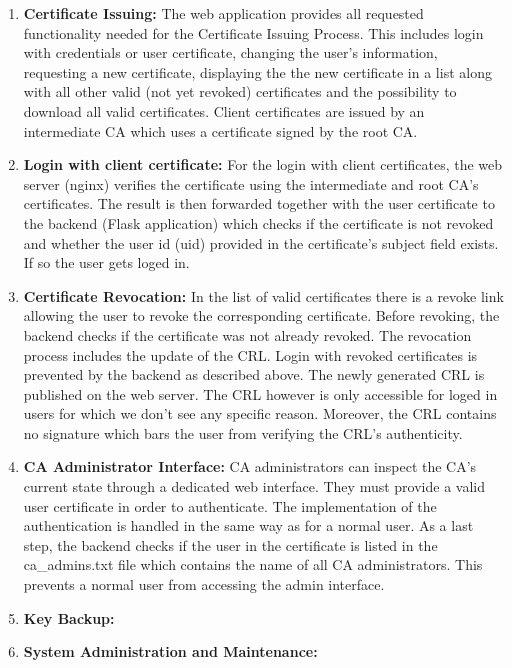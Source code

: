 \documentclass[english]{article}
\begin{document}
\begin{enumerate}

\item \textbf{Certificate Issuing: }
The web application provides all requested functionality needed for the Certificate Issuing Process. This includes login with credentials or user certificate, changing the user's information, requesting a new certificate, displaying the the new certificate in a list along with all other valid (not yet revoked) certificates and the possibility to download all valid certificates. Client certificates are issued by an intermediate CA which uses a certificate signed by the root CA. 

\item \textbf {Login with client certificate: }
For the login with client certificates, the web server (nginx) verifies the certificate using the intermediate and root CA's certificates. The result is then forwarded together with the user certificate to the backend (Flask application) which checks if the certificate is not revoked and whether the user id (uid) provided in the certificate's subject field exists. If so the user gets loged in.

\item \textbf{Certificate Revocation: }
In the list of valid certificates there is a revoke link allowing the user to revoke the corresponding certificate. Before revoking, the backend  checks if the certificate was not already revoked. The revocation process includes the update of the CRL. Login with revoked certificates is prevented by the backend as described above. The newly generated CRL is published on the web server. The CRL however is only accessible for loged in users for which we don't see any specific reason. Moreover, the CRL contains no signature which bars the user from verifying the CRL's authenticity.

\item \textbf{CA Administrator Interface: }
CA administrators can inspect the CA's current state through a dedicated web interface. They must provide a valid user certificate in order to authenticate. The implementation of the authentication is handled in the same way as for a normal user. As a last step, the backend checks if the user in the certificate is listed in the ca_admins.txt file which contains the name of all CA administrators. This prevents a normal user from accessing the admin interface.

\item \textbf{Key Backup: }



\item \textbf{System Administration and Maintenance: }
\end{enumerate}
\end{document}
